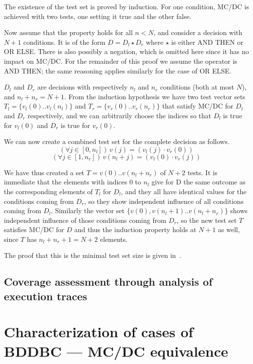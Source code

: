 \documentclass[a4paper,12pt,twoside]{article}
\begin{document}
The existence of the test set is proved by induction. For one condition,
MC/DC is achieved with two tests, one setting it true and the other false.

Now assume that the property holds for all $n<N$, and consider a decision
with $N+1$ conditions. It is of the form $D = D_l \star D_r$ where
$\star$ is either AND THEN or OR ELSE. There is also possibly a negation,
which is omitted here since it has no impact on MC/DC. For the remainder
of this proof we assume the operator is AND THEN; the same reasoning applies
similarly for the case of OR ELSE.

$D_l$ and $D_r$ are decisions with respectively $n_l$ and $n_r$ conditions
(both at most $N$), and $n_l + n_r = N+1$. From the induction hypothesis
we have two test vector sets $T_l = \{ v_l (0) .. v_l (n_l) \}$ and
$T_r = \{ v_r (0) .. v_r (n_r) \}$ that satisfy MC/DC for $D_l$ and $D_r$
respectively, and we can arbitrarily choose the indices so that
$D_l$ is true for $v_l(0)$ and $D_r$ is true for $v_r (0)$.

We can now create a combined test set for the complete decision as follows.
$$(\forall j \in [0, n_l])\, v (j) = (v_l (j) \cdot v_r (0))$$
$$(\forall j \in [1, n_r])\, v (n_l + j) = (v_l (0) \cdot v_r (j))$$

We have thus created a set $T = { v(0) .. v(n_l + n_r) }$ of $N+2$ tests.
It is immediate that the elements with indices 0 to $n_l$ give for D
the same outcome as the corresponding elements of $T_l$ for $D_l$,
and they all have identical values for the conditions coming from $D_r$,
so they show independent influence of all conditions coming from $D_l$.
Similarly the vector set $\{v(0), v(n_l+1) .. v(n_l + n_r)\}$ shows
independent influence of those conditions coming from $D_r$, so the new
test set $T$ satisfies MC/DC for $D$ and thus the induction property holds at
$N+1$ as well, since $T$ has $n_l + n_r + 1 = N+2$ elements.

The proof that this is the minimal test set size is given in~\cite{ar0118}.

\subsection{Coverage assessment through analysis of execution traces}


\section{Characterization of cases of BDDBC --- MC/DC equivalence}
\end{document}
